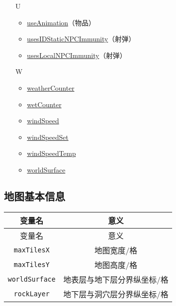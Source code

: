 \begin{multicols}{2}[]
{\begin{itemize}
\begin{itemize}
	\item \hyperref[tab4618]{safeRangeX}
	\item \hyperref[tab4618]{safeRangeY}
	\item \hyperref[tab9]{sHeight}
	\item \hyperref[tab4618]{spawnRangeX}
	\item \hyperref[tab4618]{spawnRangeY}
	\item \hyperref[tab10]{stuckAmount}
	\item \hyperref[tab10]{stuckCount}
	\item \hyperref[tab9]{sWidth}
	\end{itemize}
\item[U] \begin{itemize}
	\item \hyperref[sec28]{useAnimation}（物品）
	\item \hyperref[sec25]{usesIDStaticNPCImmunity}（射弹）
	\item \hyperref[sec25]{usesLocalNPCImmunity}（射弹）
	\end{itemize}
\item[W] \begin{itemize}
	\item \href{https://www.bbstr.net/threads/133/#post-623}{weatherCounter}
	\item \hyperref[tab10]{wetCounter}
	\item \href{https://www.bbstr.net/threads/133/#post-623}{windSpeed}
	\item \href{https://www.bbstr.net/threads/133/#post-623}{windSpeedSet}
	\item \href{https://www.bbstr.net/threads/133/#post-623}{windSpeedTemp}
	\item \hyperref[tab8]{worldSurface}
	\end{itemize}
\end{itemize}
}
\end{multicols}

\subsection{地图基本信息}
\begin{longtable}{|c|c|}
\hline \label{tab8}变量名&意义\\\hline
\endfirsthead
变量名&意义\\\hline
\endhead
\hline
\endfoot
{\lstinline!maxTilesX!}&地图宽度/格\\\hline
{\lstinline!maxTilesY!}&地图高度/格\\\hline
{\lstinline!worldSurface!}&地表层与地下层分界纵坐标/格\\\hline
{\lstinline!rockLayer!}&地下层与洞穴层分界纵坐标/格\\
\end{longtable}

